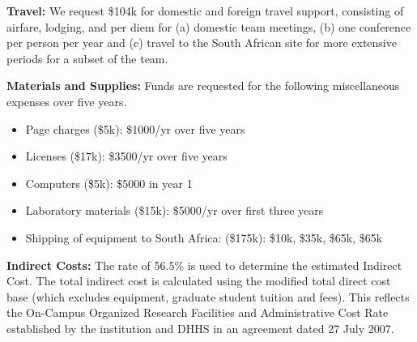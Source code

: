\documentclass[onecolumn,11pt]{aastex}
\begin{document}
{\bf Travel:} We request \$104k for domestic and foreign travel support, consisting of airfare, lodging, and per diem for (a) domestic team meetings, (b) one conference per person per year and (c) travel to the South African site for more extensive periods for a subset of the team.

{\bf Materials and Supplies:}  Funds are requested for the following miscellaneous expenses over five years.
\begin{itemize}
\item Page charges (\$5k): \$1000/yr over five years
\item Licenses (\$17k):  \$3500/yr over five years
\item Computers (\$5k):  \$5000 in year 1
\item Laboratory materials (\$15k):  \$5000/yr over first three years
\item Shipping of equipment to South Africa:  (\$175k):  \$10k, \$35k, \$65k, \$65k
\end{itemize}

{\bf Indirect Costs:}
The rate of 56.5\% is used to determine the estimated Indirect Cost. The total indirect cost is calculated using the modified total direct cost base (which excludes equipment, graduate student tuition and fees). This reflects the On-Campus Organized Research Facilities and Administrative Cost Rate established by the institution and DHHS in an agreement dated 27 July 2007.
\end{document}
